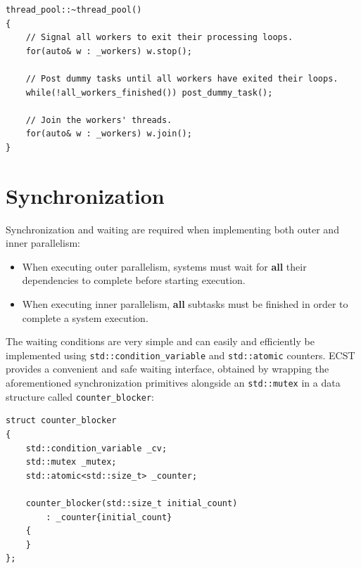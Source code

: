 \documentclass[twoside, 12pt, a4paper, openright]{book}
\begin{document}
\begin{verbatim}
thread_pool::~thread_pool()
{
    // Signal all workers to exit their processing loops.
    for(auto& w : _workers) w.stop();

    // Post dummy tasks until all workers have exited their loops.
    while(!all_workers_finished()) post_dummy_task();

    // Join the workers' threads.
    for(auto& w : _workers) w.join();
}
\end{verbatim}

\section{Synchronization}\label{synchronization}

Synchronization and waiting are required when implementing both outer
and inner parallelism:

\begin{itemize}
\item
  When executing outer parallelism, systems must wait for \textbf{all}
  their dependencies to complete before starting execution.
\item
  When executing inner parallelism, \textbf{all} subtasks must be
  finished in order to complete a system execution.
\end{itemize}

The waiting conditions are very simple and can easily and efficiently be
implemented using
\texttt{std::condition_variable}
and
\texttt{std::atomic}
counters. ECST provides a convenient and safe waiting interface,
obtained by wrapping the aforementioned synchronization primitives
alongside an
\texttt{std::mutex}
in a data structure called
\texttt{counter_blocker}:

\begin{verbatim}
struct counter_blocker
{
    std::condition_variable _cv;
    std::mutex _mutex;
    std::atomic<std::size_t> _counter;

    counter_blocker(std::size_t initial_count)
        : _counter{initial_count}
    {
    }
};
\end{verbatim}
\end{document}
